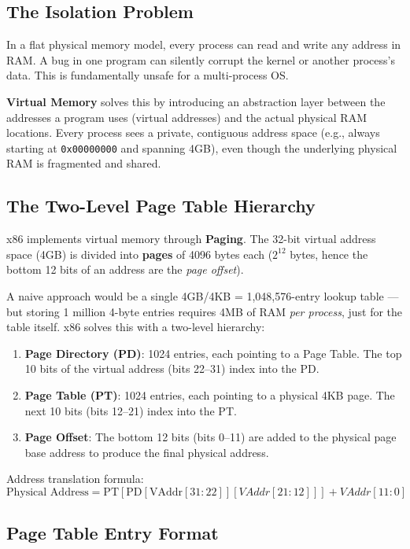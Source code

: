 \documentclass[12pt,a4paper]{report}
\begin{document}
\subsection{The Isolation Problem}

In a flat physical memory model, every process can read and write any address in RAM.
A bug in one program can silently corrupt the kernel or another process's data. This
is fundamentally unsafe for a multi-process OS.

\textbf{Virtual Memory} solves this by introducing an abstraction layer between the
addresses a program uses (virtual addresses) and the actual physical RAM locations.
Every process sees a private, contiguous address space (e.g., always starting at
\texttt{0x00000000} and spanning 4GB), even though the underlying physical RAM is
fragmented and shared.

\subsection{The Two-Level Page Table Hierarchy}

x86 implements virtual memory through \textbf{Paging}. The 32-bit virtual address
space (4GB) is divided into \textbf{pages} of 4096 bytes each ($2^{12}$ bytes,
hence the bottom 12 bits of an address are the \textit{page offset}).

A naive approach would be a single 4GB/4KB = 1,048,576-entry lookup table --- but
storing 1 million 4-byte entries requires 4MB of RAM \textit{per process}, just for
the table itself. x86 solves this with a two-level hierarchy:

\begin{enumerate}
    \item \textbf{Page Directory (PD)}: 1024 entries, each pointing to a Page Table.
    The top 10 bits of the virtual address (bits 22--31) index into the PD.
    \item \textbf{Page Table (PT)}: 1024 entries, each pointing to a physical 4KB page.
    The next 10 bits (bits 12--21) index into the PT.
    \item \textbf{Page Offset}: The bottom 12 bits (bits 0--11) are added to the
    physical page base address to produce the final physical address.
\end{enumerate}

Address translation formula:
\[
\text{Physical Address} = \text{PT}[\text{PD}[\text{VAddr}[31{:}22]][VAddr[21{:}12]]] + VAddr[11{:}0]
\]

\subsection{Page Table Entry Format}
\end{document}

